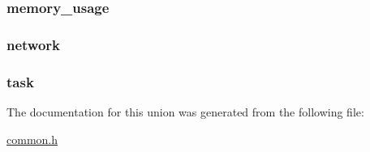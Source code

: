 \subsubsection[{\texorpdfstring{memory\+\_\+usage}{memory_usage}}]{ memory\+\_\+usage}\hypertarget{union_unification_a0d195ecd71403dc808aad5e3afe6e7e7}{}\label{union_unification_a0d195ecd71403dc808aad5e3afe6e7e7}
\subsubsection[{\texorpdfstring{network}{network}}]{ network}\hypertarget{union_unification_a2d9a64328e83ad37af17cbeb5e73b5df}{}\label{union_unification_a2d9a64328e83ad37af17cbeb5e73b5df}
\subsubsection[{\texorpdfstring{task}{task}}]{ task}\hypertarget{union_unification_a8bcc572b9d73774627be66dd46aa61a8}{}\label{union_unification_a8bcc572b9d73774627be66dd46aa61a8}


The documentation for this union was generated from the following file\+:\begin{DoxyCompactItemize}
\item 
\hyperlink{common_8h}{common.\+h}\end{DoxyCompactItemize}
